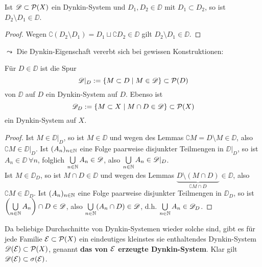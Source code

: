 \begin{lemma}
\begin{mdframed}
Ist $\mathscr{D} \subset \mathcal{P}(X)$ ein Dynkin-System und $D_1, D_2 \in \DD$ mit $D_1 \subset D_2$, so ist $D_2 \setminus D_1 \in \DD$.
\end{mdframed}
\begin{proof}
Wegen $\complement(D_2\setminus D_1) = D_1 \sqcup \complement D_2 \in \DD$ gilt $D_2 \setminus D_1 \in \DD$.
\end{proof}
\end{lemma}
$\leadsto$ Die Dynkin-Eigenschaft vererbt sich bei gewissen Konstruktionen:
\begin{folgerung}
\begin{mdframed}
Für $D \in \DD$ ist die Spur
$$\mathscr{D} |_D := \{ M\subset D \mid M \in \mathscr{D}\}\subset \mathcal{P}(D)$$
von $\DD$ auf $D$ ein Dynkin-System auf $D$. Ebenso ist
$$\mathscr{D}_D := \{M \subset X \mid M \cap D \in \mathscr{D} \} \subset \mathcal{P} (X)$$
ein Dynkin-System auf $X$.
\end{mdframed}
\begin{proof}
Ist $M \in \DD|_D$, so ist $M \in \DD$ und wegen des Lemmas $\complement M = D\setminus M \in \DD$, also $\complement M \in \DD|_D$. Ist $(A_n)_{n\in \mathbb{N}}$ eine Folge paarweise disjunkter Teilmengen in $\DD|_D$, so ist $A_n \in \DD\ \forall n$, folglich $\bigcup\limits_{n \in \mathbb{N}}A_n \in \mathscr{D}$, also $\bigcup\limits_{n\in\mathbb{N}} A_n \in \mathscr{D}|_D$.\\Ist $M\in\DD_D$, so ist $M\cap D \in \DD$ und wegen des Lemmas $\underbrace{D \setminus (M\cap D)}_{\complement M \cap D} \in \DD$, also $\complement M \in \DD_D$. Ist $(A_n)_{n\in \mathbb{N}}$ eine Folge paarweise disjunkter Teilmengen in $\DD_D$, so ist $\left(\bigcup\limits_{n\in \mathbb{N}}A_n\right)\cap D \in \mathscr{D}$, also $\bigcup\limits_{n\in\mathbb{N}} (A_n \cap D) \in \mathscr{D}$, d.h. $\bigcup\limits_{n\in\mathbb{N}}A_n \in \mathscr{D}_D$.
\end{proof}
\end{folgerung}
Da beliebige Durchschnitte von Dynkin-Systemen wieder solche sind, gibt es für jede Familie $\mathcal{E}\subset\mathcal{P}(X)$ ein eindeutiges kleinstes sie enthaltendes Dynkin-System $\mathscr{D}(\mathcal{E})\subset\mathcal{P}(X)$, genannt \textbf{das von $\mathcal{E}$ erzeugte Dynkin-System}. Klar gilt $\mathscr{D}(\mathcal{E})\subset\sigma(\mathcal{E})$.
